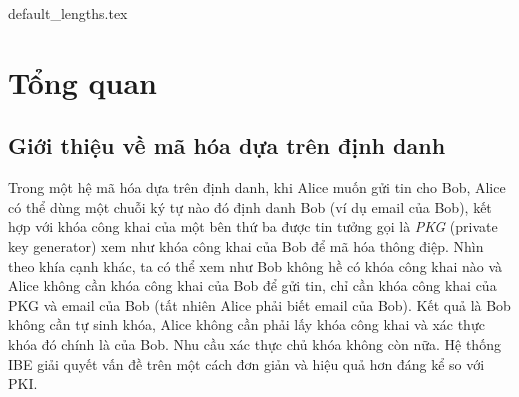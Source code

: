 \documentclass[class=report, crop=false]{standalone}
\begin{document}
	{default_lengths.tex}
	\baselineskip
	\chapter{Tổng quan}
	\section{Giới thiệu về mã hóa dựa trên định danh}
		Trong một hệ mã hóa dựa trên định danh, khi Alice muốn gửi tin cho Bob, Alice có thể dùng một chuỗi ký tự nào đó định danh Bob (ví dụ email của Bob), kết hợp với khóa công khai của một bên thứ ba được tin tưởng gọi là \textit{PKG} (private key generator) xem như khóa công khai của Bob để mã hóa thông điệp. Nhìn theo khía cạnh khác, ta có thể xem như Bob không hề có khóa công khai nào và Alice không cần khóa công khai của Bob để gửi tin, chỉ cần khóa công khai của PKG và email của Bob (tất nhiên Alice phải biết email của Bob). Kết quả là Bob không cần tự sinh khóa, Alice không cần phải lấy khóa công khai và xác thực khóa đó chính là của Bob. Nhu cầu xác thực chủ khóa không còn nữa. Hệ thống IBE giải quyết vấn đề trên một cách đơn giản và hiệu quả hơn đáng kể so với PKI.
\end{document}
